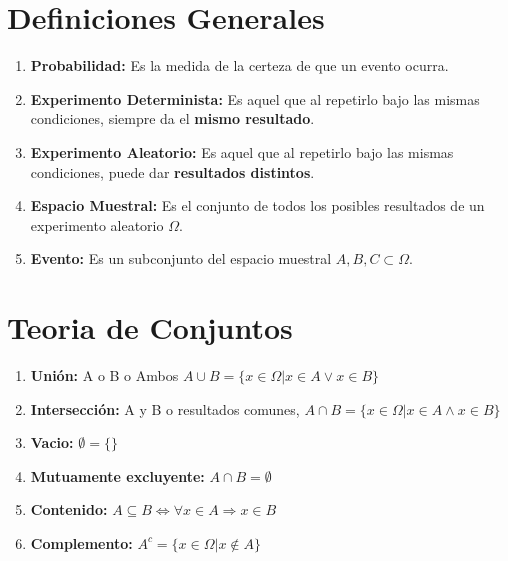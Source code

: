 \documentclass{templateNote}
\begin{document}
\portada
\margenes %


\section{Definiciones Generales}
\begin{enumerate}
    \item \textbf{Probabilidad:} Es la medida de la certeza de que un evento ocurra.
    \item \textbf{Experimento Determinista:} Es aquel que al repetirlo bajo las mismas condiciones, siempre da el \textbf{mismo resultado}.
    \item \textbf{Experimento Aleatorio:} Es aquel que al repetirlo bajo las mismas condiciones, puede dar \textbf{resultados distintos}.
    \item \textbf{Espacio Muestral:} Es el conjunto de todos los posibles resultados de un experimento aleatorio $\Omega$.
    \item \textbf{Evento:} Es un subconjunto del espacio muestral $A, B, C \subset \Omega$.
\end{enumerate}

\section{Teoria de Conjuntos}
\begin{enumerate}
    \item \textbf{Unión:} A o B o Ambos $A \cup B = \{x \in \Omega | x \in A \lor x \in B\}$
    \item \textbf{Intersección:} A y B o resultados comunes, $A \cap B = \{x \in \Omega | x \in A \land x \in B\}$
    \item \textbf{Vacio:} $\emptyset = \{\}$
    \item \textbf{Mutuamente excluyente:} $A \cap B = \emptyset$
    \item \textbf{Contenido:} $A \subseteq B \Leftrightarrow \forall x \in A \Rightarrow x \in B$
    \item \textbf{Complemento:} $A^c = \{x \in \Omega | x \notin A\}$
\end{enumerate}
\end{document}
